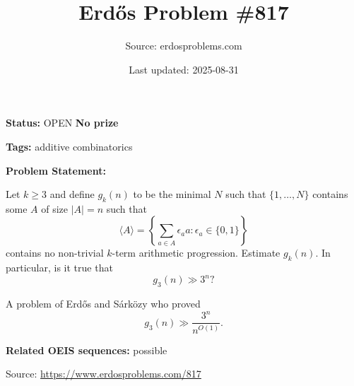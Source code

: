 \documentclass{article}
\title{Erd\H{o}s Problem \#817}
\date{Last updated: 2025-08-31}
\author{Source: erdosproblems.com}
\begin{document}
\maketitle

\noindent\textbf{Status:} OPEN \quad \textbf{No prize}

\noindent\textbf{Tags:} additive combinatorics

\medskip

\noindent\textbf{Problem Statement:}

Let $k\geq 3$ and define $g_k(n)$ to be the minimal $N$ such that $\{1,\ldots,N\}$ contains some $A$ of size $\lvert A\rvert=n$ such that\[\langle A\rangle = \left\{\sum_{a\in A}\epsilon_aa: \epsilon_a\in \{0,1\}\right\}\]contains no non-trivial $k$-term arithmetic progression. Estimate $g_k(n)$. In particular, is it true that\[g_3(n) \gg 3^n?\]




A problem of Erd\H{o}s and S\'{a}rk\"{o}zy who proved\[g_3(n) \gg \frac{3^n}{n^{O(1)}}.\]

\noindent\textbf{Related OEIS sequences:} possible


\bigskip
\noindent\small{Source: \url{https://www.erdosproblems.com/817}}
\end{document}
